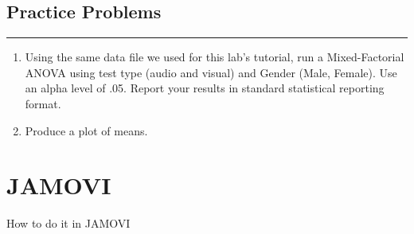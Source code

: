 \documentclass[]{book}
\begin{document}
\subsection{Practice Problems}\label{practice-problems-11}

\begin{center}\rule{0.5\linewidth}{0.5pt}\end{center}

\begin{enumerate}
\def\labelenumi{\arabic{enumi}.}
\item
  Using the same data file we used for this lab's tutorial, run a
  Mixed-Factorial ANOVA using test type (audio and visual) and Gender
  (Male, Female). Use an alpha level of .05. Report your results in
  standard statistical reporting format.
\item
  Produce a plot of means.
\end{enumerate}

\section{JAMOVI}\label{jamovi-11}

How to do it in JAMOVI


\end{document}
